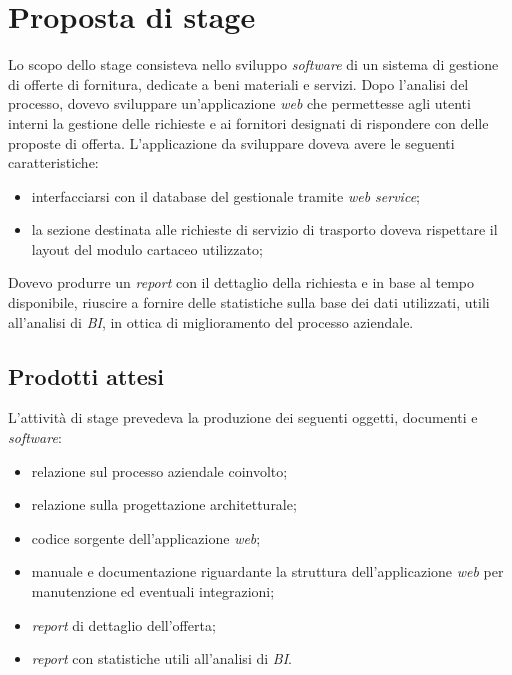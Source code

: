 \section{Proposta di stage}

Lo scopo dello stage consisteva nello sviluppo \textit{software} di un sistema di gestione di offerte di fornitura, dedicate a beni materiali e servizi. Dopo l'analisi del processo, dovevo sviluppare un'applicazione \textit{web} che permettesse agli utenti interni la gestione delle richieste e ai fornitori designati di rispondere con delle proposte di offerta.
L'applicazione da sviluppare doveva avere le seguenti caratteristiche:
\begin{itemize}
	\item interfacciarsi con il database del gestionale tramite \textit{web service};
	\item la sezione destinata alle richieste di servizio di trasporto doveva rispettare il layout del modulo cartaceo utilizzato;
\end{itemize}
Dovevo produrre un \textit{report} con il dettaglio della richiesta e in base al tempo disponibile, riuscire a fornire delle statistiche sulla base dei dati utilizzati, utili all'analisi di \textit{BI}, in ottica di miglioramento del processo aziendale.


\subsection{Prodotti attesi}
L'attività di stage prevedeva la produzione dei seguenti oggetti, documenti e \textit{software}:
\begin{itemize}
	\item relazione sul processo aziendale coinvolto;
	\item relazione sulla progettazione architetturale;
	\item codice sorgente dell'applicazione \textit{web};
	\item manuale e documentazione riguardante la struttura dell'applicazione \textit{web} per
	manutenzione ed eventuali integrazioni;
	\item \textit{report} di dettaglio dell'offerta;
	\item \textit{report} con statistiche utili all'analisi di \textit{BI}.
\end{itemize}


